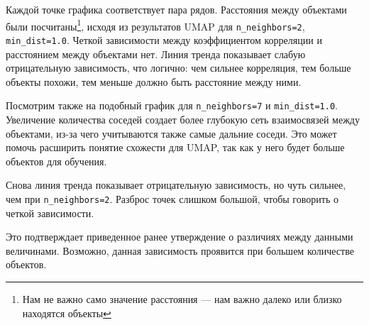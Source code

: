 Каждой точке графика соответствует пара рядов. Расстояния между объектами были посчитаны\footnote{Нам не важно само значение расстояния --- нам важно далеко или близко находятся объекты}, исходя из результатов UMAP для \verb|n_neighbors=2|, \verb|min_dist=1.0|. Четкой зависимости между коэффициентом корреляции и расстоянием между объектами нет. Линия тренда показывает слабую отрицательную зависимость, что логично: чем сильнее корреляция, тем больше объекты похожи, тем меньше должно быть расстояние между ними.

Посмотрим также на подобный график для \verb|n_neighbors=7| и \verb|min_dist=1.0|. Увеличение количества соседей создает более глубокую сеть взаимосвязей между объектами, из-за чего учитываются также самые дальние соседи. Это может помочь расширить понятие схожести для UMAP, так как у него будет больше объектов для обучения.
\begin{figure}[H]
	\noindent {}
\end{figure} 

Снова линия тренда показывает отрицательную зависимость, но чуть сильнее, чем при \verb|n_neighbors=2|. Разброс точек слишком большой, чтобы говорить о четкой зависимости.

Это подтверждает приведенное ранее утверждение о различиях между данными величинами. Возможно, данная зависимость проявится при большем количестве объектов.
